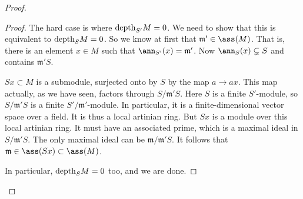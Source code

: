 \begin{example}
\begin{proof}
\begin{proof}
The hard case is where $\mathrm{depth}_{S'} M = 0$. We need to show that this is
equivalent to $\mathrm{depth}_{S} M = 0$. So we know at first that $\mathfrak{m}' \in
\ass(M)$. That is, there is an element $x \in M$ such that $\ann_{S'}(x) =
\mathfrak{m}'$.
Now $\ann_S(x) \subsetneq S$ and contains $\mathfrak{m}' S$.

$Sx \subset M$ is a submodule, surjected onto by $S$ by the map $a \to ax$.
This map actually, as we have seen, factors through $S/\mathfrak{m}' S$. Here
$S$ is a finite $S'$-module, so $S/\mathfrak{m}'S$ is a finite
$S'/\mathfrak{m}'$-module. In particular, it is a finite-dimensional vector space
over a field. It is thus a local artinian ring. But $Sx$ is a module over this
local artinian ring. It must have an associated prime, which is a maximal
ideal in $S/\mathfrak{m}'S$. The only maximal ideal can be
$\mathfrak{m}/\mathfrak{m}'S$.  It follows that $\mathfrak{m} \in \ass(Sx)
\subset \ass(M)$.

In particular, $\mathrm{depth}_S M = 0$ too, and we are done.
\end{proof} 

\end{proof} 
\end{example} 
